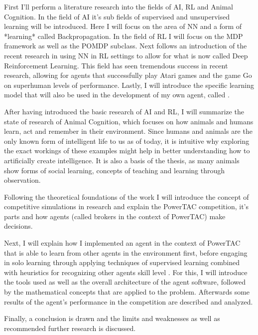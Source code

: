 First I'll perform a literature research into the fields of \ac{AI}, \ac{RL} and Animal Cognition. In the field of AI it's sub fields of supervised and unsupervised learning will be introduced. Here I will focus on the area of \ac{NN} and a form of *learning* called Backpropagation. In the field of \ac{RL} I will focus on the \ac{MDP} framework as well as the \ac{POMDP} subclass. 
Next follows an introduction of the recent research in using \ac{NN} in \ac{RL} settings to allow for what is now called Deep Reinforcement Learning. This field has seen tremendous success in recent research, allowing for agents that successfully play 
Atari games and the game Go on superhuman levels of performance.
Lastly, I will introduce the specific learning model that will also be used in the development of my own agent, called %
.

After having introduced the basic research of \ac{AI} and \ac{RL}, I will summarize the state of research of Animal Cognition, which focuses on how animals and humans learn, act and remember in their environment. Since humans and animals are the only known form of intelligent life to us as of today, it is intuitive why exploring the exact workings of these examples might help in better understanding how to artificially create intelligence. It is also a basis of the thesis, as many animals show forms of social learning, concepts of teaching and learning through observation.

Following the theoretical foundations of the work I will introduce the concept of competitive simulations in research and explain the \ac{PowerTAC} competition, it's parts and how agents (called brokers in the context of \ac{PowerTAC}) make decisions. 

Next, I will explain how I implemented an agent in the context of \ac{PowerTAC} that is able to learn from other agents in the environment first, before engaging in solo learning through applying techniques of supervised learning combined with heuristics for recognizing other agents skill level %
. For this, I will introduce the tools used as well as the overall architecture of the agent software, followed by the mathematical concepts that are applied to the problem. Afterwards some results of the agent's performance in the competition are described and analyzed.

Finally, a conclusion is drawn and the limits and weaknesses as well as recommended further research is discussed.


